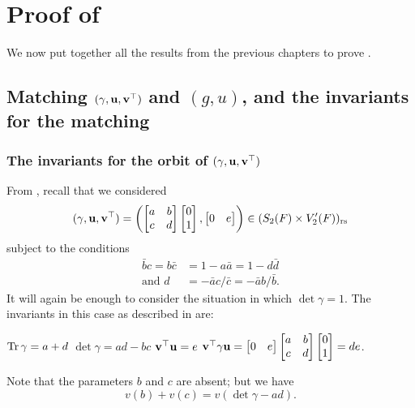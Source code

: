 \chapter{Proof of }
We now put together all the results from the previous chapters to
prove .

\section{Matching ${(\gamma, \mathbf u, \mathbf v^\top)}$ and $(g,u)$, and the invariants for the matching}
\subsection{The invariants for the orbit of ${(\gamma, \mathbf u, \mathbf v^\top)}$}
From , recall that we considered
\[
  (\gamma, \mathbf u, \mathbf v^\top)
  =
  \left( \begin{bmatrix} a & b \\ c & d \end{bmatrix}
    \begin{bmatrix} 0 \\ 1 \end{bmatrix}, \begin{bmatrix} 0 & e \end{bmatrix} \right)
  \in (S_2(F) \times V'_2(F))_{\mathrm{rs}}
\]
subject to the conditions
\begin{align*}
  \bar b c = b \bar c &= 1 - a \bar a = 1 - d \bar d \\
  \text{and } d &= - \bar a c / \bar c = -\bar a b / \bar b.
\end{align*}
It will again be enough to consider the situation in which $\det \gamma = 1$.
The invariants in this case as described in  are:
\begin{itemize}
  \ii $\operatorname{Tr} \gamma = a + d$
  \ii $\det \gamma = ad - bc$
  \ii $\mathbf v^\top \mathbf u = e$
  \ii $\mathbf v^\top \gamma \mathbf u = \begin{bmatrix} 0 & e \end{bmatrix}
  \begin{bmatrix} a & b \\ c & d \end{bmatrix} \begin{bmatrix} 0 \\ 1 \end{bmatrix} = de$.
\end{itemize}
Note that the parameters $b$ and $c$ are absent; but we have
\[ v(b) + v(c) = v(\det \gamma - a d). \]

